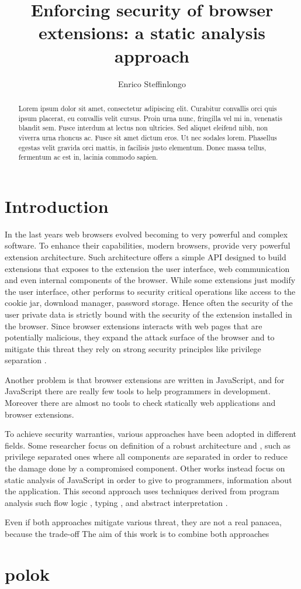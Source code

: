 \documentclass[10pt]{llncs}
\author{Enrico Steffinlongo}
\institute{Universit\`{a} Ca' Foscari Venezia}
\title{Enforcing security of browser extensions: a static analysis approach}
\begin{document}
\maketitle

\begin{abstract}
Lorem ipsum dolor sit amet, consectetur adipiscing elit. Curabitur convallis orci quis ipsum placerat, eu convallis velit cursus. Proin urna nunc, fringilla vel mi in, venenatis blandit sem. Fusce interdum at lectus non ultricies. Sed aliquet eleifend nibh, non viverra urna rhoncus ac. Fusce sit amet dictum eros. Ut nec sodales lorem. Phasellus egestas velit gravida orci mattis, in facilisis justo elementum. Donec massa tellus, fermentum ac est in, lacinia commodo sapien.
\end{abstract}

\section{Introduction}
In the last years web browsers evolved becoming to very powerful and complex software. To enhance their capabilities, modern browsers, provide very powerful extension architecture. Such architecture offers a simple API designed to build extensions that exposes to the extension the user interface, web communication and even internal components of the browser. While some extensions just modify the user interface, other performs to security critical operations like access to the cookie jar, download manager, password storage. Hence often the security of the user private data is strictly bound with the security of the extension installed in the browser. Since browser extensions interacts with web pages that are potentially malicious, they expand the attack surface of the browser and to mitigate this threat they rely on strong security principles like privilege separation \cite{ChromeExtSpec}.

Another problem is that browser extensions are written in JavaScript, and for JavaScript there are really few tools to help programmers in development. Moreover there are almost no tools to check statically web applications and browser extensions.

To achieve security warranties, various approaches have been adopted in different fields. Some researcher focus on definition of a robust architecture \cite{ChromeExtSpec} and \cite{PriviSep}, such as privilege separated ones where all components are separated in order to reduce the damage done by a compromised component. Other works instead focus on static analysis of JavaScript in order to give to programmers, information about the application. This second approach uses techniques derived from program analysis \cite{PrincipleProgramAnalysis} such flow logic \cite{FlowLogic}, typing \cite{TAJS}, and abstract interpretation \cite{LambdaJSMightVanHorn}.

Even if both approaches mitigate various threat, they are not a real panacea, because the trade-off 
The aim of this work is to combine both approaches 


\section{polok}
\lipsum[1-3]

\cite{*}




\end{document}
